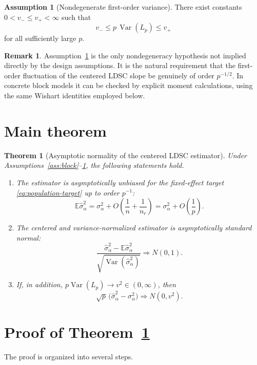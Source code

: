 \documentclass[11pt]{article}
\newtheorem{theorem}{Theorem}
\theoremstyle{definition}
\newtheorem{remark}{Remark}
\newtheorem{assumption}{Assumption}
\newcommand{\E}{\mathbb{E}}
\newcommand{\Var}{\operatorname{Var}}
\newcommand{\1}{\mathbf{1}}
\newcommand{\dto}{\Longrightarrow}
\begin{document}
\begin{assumption}[Nondegenerate first-order variance]\label{ass:variance}
There exist constants $0<v_-\le v_+<\infty$ such that
\[
 v_-\le p\,\Var(L_p)\le v_+
\]
for all sufficiently large $p$.
\end{assumption}

\begin{remark}
Assumption~\ref{ass:variance} is the only nondegeneracy hypothesis not implied directly by the design assumptions. It is the natural requirement that the first-order fluctuation of the centered LDSC slope be genuinely of order $p^{-1/2}$. In concrete block models it can be checked by explicit moment calculations, using the same Wishart identities employed below.
\end{remark}

\section*{Main theorem}

\begin{theorem}[Asymptotic normality of the centered LDSC estimator]\label{thm:main}
Under Assumptions~\ref{ass:block}--\ref{ass:variance}, the following statements hold.

\begin{enumerate}[label=(\roman*)]
\item The estimator is asymptotically unbiased for the fixed-effect target \eqref{eq:population-target} up to order $p^{-1}$:
\[
 \E\widehat\sigma_\alpha^2=\sigma_\alpha^2+O\!\left(\frac1n+\frac1{n_r}\right)=\sigma_\alpha^2+O\!\left(\frac1p\right).
\]

\item The centered and variance-normalized estimator is asymptotically standard normal:
\[
 \frac{\widehat\sigma_\alpha^2-\E\widehat\sigma_\alpha^2}{\sqrt{\Var(\widehat\sigma_\alpha^2)}}\dto N(0,1).
\]

\item If, in addition, $p\Var(L_p)\to v^2\in(0,\infty)$, then
\[
 \sqrt p\,\bigl(\widehat\sigma_\alpha^2-\sigma_\alpha^2\bigr)\dto N(0,v^2).
\]
\end{enumerate}
\end{theorem}

\section*{Proof of Theorem~\ref{thm:main}}

The proof is organized into several steps.
\end{document}
